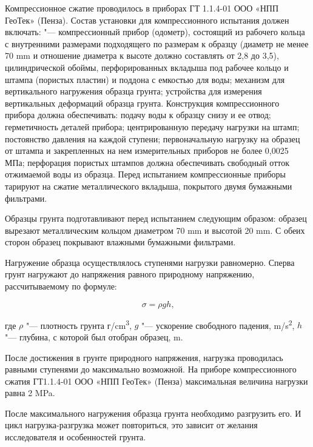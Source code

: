 Компрессионное сжатие проводилось в приборах ГТ 1.1.4-01 ООО «НПП ГеоТек» (Пенза).
Состав установки для компрессионного испытания должен включать: 
"--- компрессионный прибор (одометр), состоящий из рабочего кольца с
внутренними размерами подходящего по размерам к образцу (диаметр не менее 70 \si{\milli\meter} 
и отношение диаметра к высоте должно составлять от 2,8 до 3,5), цилиндрической обоймы,
перфорированных вкладыша под рабочее кольцо и штампа (пористых пластин) и поддона с емкостью для воды; 
механизм для вертикального нагружения образца грунта; 
устройства для измерения вертикальных деформаций образца грунта.
Конструкция компрессионного прибора должна обеспечивать: подачу воды к образцу снизу и ее отвод; 
герметичность деталей прибора; центрированную передачу нагрузки на штамп; постоянство давления 
на каждой ступени; первоначальную нагрузку на образец от штампа и закрепленных на нем
измерительных приборов не более 0,0025 МПа; перфорация пористых штампов должна 
обеспечивать свободный отток отжимаемой воды из образца.
Перед испытанием компрессионные приборы тарируют на сжатие металлического 
вкладыша, покрытого двумя бумажными фильтрами.

Образцы грунта подготавливают перед испытанием следующим образом:
образец вырезают металлическим кольцом диаметром 70 \si{\milli\meter} 
и высотой 20 \si{\milli\meter}. С обеих сторон образец покрывают 
влажными бумажными фильтрами. 

Нагружение образца осуществлялось ступенями нагрузки равномерно. 
Сперва грунт нагружают до напряжения равного природному 
напряжению, рассчитываемому по формуле: 

\[
   \sigma = \rho g h \text{,}
\]

где $\rho$ "--- плотность грунта г/\si{\centi\meter^3},
$g$ "--- ускорение свободного падения, \si{\meter}/\si{\second^2},
$h$ "--- глубина, с которой был отобран образец, \si{\meter}.

После достижения в грунте природного напряжения, нагрузка 
проводилась равными ступенями до максимально возможной. На приборе 
компрессионного сжатия ГТ1.1.4-01 ООО «НПП ГеоТек» (Пенза) максимальная 
величина нагрузки равна 2 \si{\mega\pascal}.

После максимального нагружения образца грунта необходимо разгрузить его. 
И цикл нагрузка-разгрузка может повториться, это зависит от желания исследователя и особенностей грунта.

